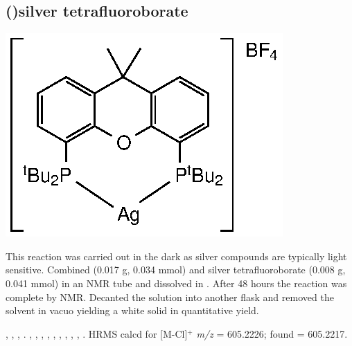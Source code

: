

\subsection*{(\tBuXantphos)silver tetrafluoroborate} %

\begin{structure}[h]
\begin{center}
\includegraphics{../Structures/CtBuSilverBF4.eps}
\end{center}
\end{structure}
This reaction was carried out in the dark as silver compounds are typically light sensitive.  Combined \tBuxantphos{} (0.017 g, 0.034 mmol) and silver tetrafluoroborate (0.008 g, 0.041 mmol) in an NMR tube and dissolved in .  After 48 hours the reaction was complete by NMR.  Decanted the solution into another flask and removed the solvent in vacuo yielding a white solid in quantitative yield.  

,
,
,
.
,
,
,
,
,
,
,
,
,
.
HRMS calcd for  [M-Cl]$^+$ \emph{m/z} = 605.2226; found = 605.2217.


